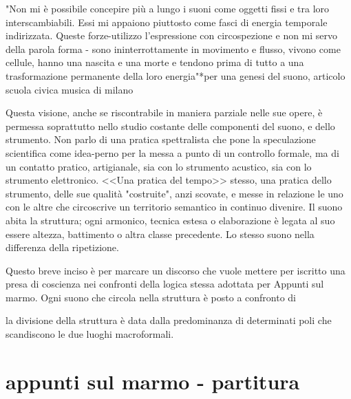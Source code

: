  "Non mi è possibile concepire più a lungo i suoni come oggetti fissi e tra loro interscambiabili. Essi mi appaiono piuttosto come fasci di energia temporale indirizzata. Queste forze-utilizzo l'espressione con circospezione e non mi servo della parola forma - sono ininterrottamente in movimento e flusso, vivono come cellule, hanno una nascita e una morte e tendono prima di tutto a una trasformazione permanente della loro energia"*per una genesi del suono, articolo scuola civica musica di milano

Questa visione, anche se riscontrabile in maniera parziale nelle sue opere, è permessa soprattutto nello studio costante delle componenti del suono, e dello strumento.
Non parlo di una pratica spettralista che pone la speculazione scientifica come idea-perno per la messa a punto di un controllo formale, ma di un contatto pratico, artigianale, sia con lo strumento acustico, sia con lo strumento elettronico.
<<Una pratica del tempo>> stesso, una pratica dello strumento, delle sue qualità "costruite", anzi scovate, e messe in relazione le uno con le altre che circoscrive un territorio semantico in continuo divenire.
Il suono abita la struttura; ogni armonico, tecnica estesa o elaborazione è legata al suo essere altezza, battimento o altra classe precedente. Lo stesso suono nella differenza della ripetizione.

Questo breve inciso è per marcare un discorso che vuole mettere per iscritto una presa di coscienza nei confronti della logica stessa adottata per Appunti sul marmo.
Ogni suono che circola nella struttura è posto a confronto di

la divisione della struttura è data dalla predominanza di determinati poli che scandiscono  le due luoghi macroformali.

\part*{appunti sul marmo - partitura}
